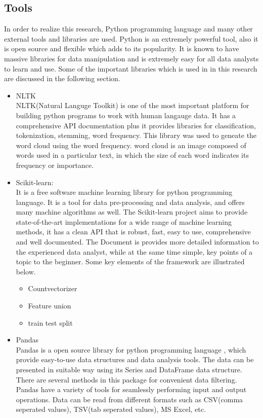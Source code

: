 \subsection{Tools}
In order to realize this research, Python programming language and many other external tools and libraries are used. Python is an extremely powerful tool, also it is open source and flexible which adds to its popularity. It is known to have massive libraries for data manipulation and is extremely easy for all data analysts to learn and use. Some of the important libraries which is used in in this research are discussed in the following section.  


\begin{itemize}
    \item NLTK \\
    NLTK(Natural Languge Toolkit) is one of the most important platform for building python programs to work with human langauge data. It has a comprehensive API documentation plus it provides libraries for classification, tokenization, stemming, word frequency. This library was used to geneate the word cloud using the word frequency. word cloud is an image composed of words used in a particular text, in which the size of each word indicates its frequency or importance.
    
  
    \item Scikit-learn: \\
    It  \cite{scikit-learn} is a free software machine learning library for python programming language. It is a tool for data pre-processing and data analysis, and offers many machine algorithms as well. The Scikit-learn project aims to provide state-of-the-art implementations for a wide range of machine learning methods, it has a clean API that is robust, fast, easy to use, comprehensive and well documented. The Document is provides more detailed information to the experienced data analyst, while at the same time simple, key points of a topic to the beginner. Some key elements of the framework are illustrated below.
    
    \begin{itemize}
        \item Countvectorizer
        \item Feature union
        \item train test split
    \end{itemize}
    
    
 
    
    \item Pandas \\
   Pandas \cite{pythonpandas} is a open source library for python programming language , which provide easy-to-use data structures and data analysis tools. The data can be presented in suitable way using its Series and DataFrame data structure.
  There are several methods in this package for convenient data filtering. Pandas have a variety of tools for seamlessly performing input and output operations. Data can be read from different formats such as CSV(comma seperated values), TSV(tab seperated values), MS Excel, etc.



\end{itemize}




